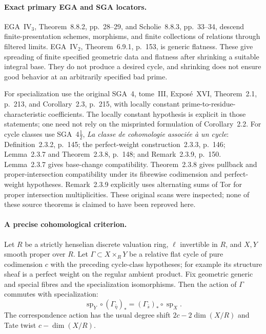 \documentclass[11pt]{article}
\theoremstyle{definition}\newtheorem{definition}[theorem]{Definition}\newtheorem{remark}[theorem]{Remark}
\begin{document}
\paragraph{Exact primary EGA and SGA locators.}
EGA~IV$_3$, Theorem~8.8.2, pp.~28--29, and Scholie~8.8.3,
pp.~33--34, descend finite-presentation schemes, morphisms, and
finite collections of relations through filtered limits.
EGA~IV$_2$, Theorem~6.9.1, p.~153, is generic flatness. These give
spreading of finite specified geometric data and flatness after
shrinking a suitable integral base. They do not produce a desired
cycle, and shrinking does not ensure good behavior at an arbitrarily
specified bad prime.

For specialization use the original SGA~4, tome~III,
Expos\'e~XVI, Theorem~2.1, p.~213, and Corollary~2.3, p.~215,
with locally constant prime-to-residue-characteristic coefficients.
The locally constant hypothesis is explicit in those statements;
one need not rely on the misprinted formulation of Corollary~2.2.
For cycle classes use SGA~4$\frac12$, \emph{La classe de cohomologie
associ\'ee \`a un cycle}: Definition~2.3.2, p.~145;
the perfect-weight construction~2.3.3, p.~146;
Lemma~2.3.7 and Theorem~2.3.8, p.~148; and
Remark~2.3.9, p.~150. Lemma~2.3.7 gives base-change compatibility.
Theorem~2.3.8 gives pullback and proper-intersection compatibility
under its fibrewise codimension and perfect-weight hypotheses.
Remark~2.3.9 explicitly uses alternating sums of Tor for proper
intersection multiplicities. These original scans were inspected;
none of these source theorems is claimed to have been reproved here.

\paragraph{A precise cohomological criterion.}
Let $R$ be a strictly henselian discrete valuation ring,
$\ell$ invertible in $R$, and $X,Y$ smooth proper over $R$.
Let $\Gamma\subset X\times_RY$ be a relative flat cycle of pure
codimension $c$ with the preceding cycle-class hypotheses; for
example its structure sheaf is a perfect weight on the regular
ambient product. Fix geometric generic and special fibres and the
specialization isomorphisms. Then the action of $\Gamma$ commutes
with specialization:
\[
 \operatorname{sp}_Y\circ(\Gamma_{\bar\eta})_*
       =(\Gamma_{\bar s})_*\circ\operatorname{sp}_X.
\]
The correspondence action has the usual degree shift
$2c-2\dim(X/R)$ and Tate twist $c-\dim(X/R)$.
\end{document}
